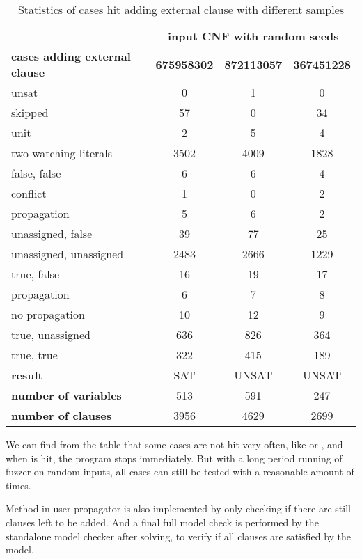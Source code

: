 \begin{table}[!htbp]
  \centering
  \begin{tabular}{|l|c|c|c|}
    \hline
    & \multicolumn{3}{c|}{\textbf{input CNF with random seeds}} \\
    \cline{2-4}
    \textbf{cases adding external clause} & \textbf{675958302} & \textbf{872113057} & \textbf{367451228} \\
    \hline
    unsat & 0 & 1 & 0 \\
    skipped & 57 & 0 & 34 \\
    unit & 2 & 5 & 4 \\
    two watching literals & 3502 & 4009 & 1828 \\
    \quad false, false & 6 & 6 & 4 \\
    \quad\quad conflict & 1 & 0 & 2 \\
    \quad\quad propagation & 5 & 6 & 2 \\
    \quad unassigned, false & 39 & 77 & 25 \\
    \quad unassigned, unassigned & 2483 & 2666 & 1229 \\
    \quad true, false & 16 & 19 & 17 \\
    \quad\quad propagation & 6 & 7 & 8 \\
    \quad\quad no propagation & 10 & 12 & 9 \\
    \quad true, unassigned & 636 & 826 & 364 \\
    \quad true, true & 322 & 415 & 189 \\
    \hline
    \textbf{result} & SAT & UNSAT & UNSAT \\
    \textbf{number of variables} & 513 & 591 & 247 \\
    \textbf{number of clauses} & 3956 & 4629 & 2699 \\
    \hline
  \end{tabular}
  \caption{Statistics of cases hit adding external clause with different samples}
  \label{tab:stats}
\end{table}

We can find from the table that some cases are not hit very often, like  or , and when  is hit, the program stops immediately. But with a long period running of fuzzer on random inputs, all cases can still be tested with a reasonable amount of times.

Method  in user propagator is also implemented by only checking if there are still clauses left to be added. And a final full model check is performed by the standalone model checker after solving, to verify if all clauses are satisfied by the model.

